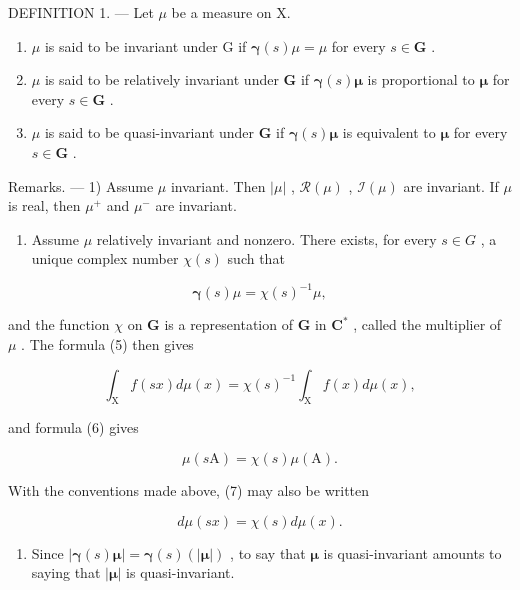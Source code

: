 DEFINITION 1. --- Let \(\mu\) be a measure on X.

\begin{enumerate}
\def\labelenumi{\alph{enumi})}
\item
  \(\mu\) is said to be invariant under G if \(\pmb{\gamma}(s)\mu = \mu\) for every \(s\in \mathbf{G}\) .
\item
  \(\mu\) is said to be relatively invariant under \(\mathbf{G}\) if \(\pmb{\gamma}(s)\pmb{\mu}\) is proportional to \(\pmb{\mu}\) for every \(s\in \mathbf{G}\) .
\item
  \(\mu\) is said to be quasi-invariant under \(\mathbf{G}\) if \(\pmb{\gamma}(s)\pmb{\mu}\) is equivalent to \(\pmb{\mu}\) for every \(s\in \mathbf{G}\) .
\end{enumerate}

Remarks. --- 1) Assume \(\mu\) invariant. Then \(|\mu|\) , \(\mathcal{R}(\mu)\) , \(\mathcal{I}(\mu)\) are invariant. If \(\mu\) is real, then \(\mu^{+}\) and \(\mu^{-}\) are invariant.

\begin{enumerate}
\def\labelenumi{\arabic{enumi})}
\setcounter{enumi}{1}
\tightlist
\item
  Assume \(\mu\) relatively invariant and nonzero. There exists, for every \(s \in G\) , a unique complex number \(\chi(s)\) such that
\end{enumerate}

\[
\boldsymbol {\gamma} (s) \mu = \chi (s) ^ {- 1} \mu ,\tag{7}
\]

and the function \(\chi\) on \(\mathbf{G}\) is a representation of \(\mathbf{G}\) in \(\mathbf{C}^*\) , called the multiplier of \(\mu\) . The formula (5) then gives

\[
\int_ {\mathrm{X}} f (s x) d \mu (x) = \chi (s) ^ {- 1} \int_ {\mathrm{X}} f (x) d \mu (x),\tag{8}
\]

and formula (6) gives

\[
\mu (s \mathrm{A}) = \chi (s) \mu (\mathrm{A}).\tag{9}
\]

With the conventions made above, (7) may also be written

\[
d \mu (s x) = \chi (s) d \mu (x).\tag{10}
\]

\begin{enumerate}
\def\labelenumi{\arabic{enumi})}
\setcounter{enumi}{2}
\tightlist
\item
  Since \(|\pmb{\gamma}(s)\pmb{\mu}| = \pmb{\gamma}(s)(|\pmb{\mu}|)\) , to say that \(\pmb{\mu}\) is quasi-invariant amounts to saying that \(|\pmb{\mu}|\) is quasi-invariant.
\end{enumerate}

